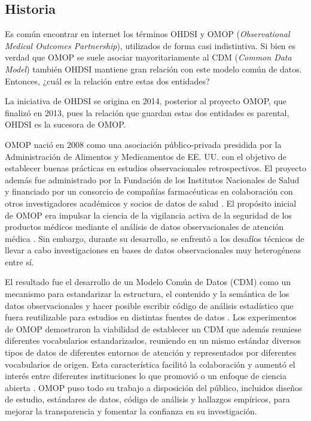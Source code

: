 \subsection{Historia}

Es común encontrar en internet los términos OHDSI y OMOP (\textit{Observational Medical Outcomes Partnership}), utilizados de forma casi indistintiva. Si bien es verdad que OMOP se suele asociar mayoritariamente al CDM (\textit{Common Data Model}) también OHDSI mantiene gran relación con este modelo común de datos. Entonces, ¿cuál es la relación entre estas dos entidades? 

La iniciativa de OHDSI se origina en 2014, posterior al proyecto OMOP, que finalizó en 2013, pues la relación que guardan estas dos entidades es parental, OHDSI es la sucesora de OMOP.

OMOP nació en 2008 como una asociación público-privada presidida por la Administración de Alimentos y Medicamentos de EE. UU. con el objetivo de establecer buenas prácticas en estudios observacionales retrospectivos. El proyecto además fue administrado por la Fundación de los Institutos Nacionales de Salud y financiado por un consorcio de compañías farmacéuticas en colaboración con otros investigadores académicos y socios de datos de salud \cite{stang2010advancing}. El propósito inicial de OMOP era impulsar la ciencia de la vigilancia activa de la seguridad de los productos médicos mediante el análisis de datos observacionales de atención médica \cite{stang2010advancing}. Sin embargo, durante su desarrollo, se enfrentó a los desafíos técnicos de llevar a cabo investigaciones en bases de datos observacionales muy heterogéneas entre sí.

El resultado fue el desarrollo de un Modelo Común de Datos (CDM) como un mecanismo para estandarizar la estructura, el contenido y la semántica de los datos observacionales y hacer posible escribir código de análisis estadístico que fuera reutilizable para estudios en distintas fuentes de datos \cite{overhage2012validation}. Los experimentos de OMOP demostraron la viabilidad de establecer un CDM que además reuniese diferentes vocabularios estandarizados, reuniendo en un mismo estándar diversos tipos de datos de diferentes entornos de atención y representados por diferentes vocabularios de origen. Esta característica facilitó la colaboración y aumentó el interés entre diferentes instituciones lo que promovió o un enfoque de ciencia abierta \cite{OHDSIbook}. OMOP puso todo su trabajo a disposición del público, incluidos diseños de estudio, estándares de datos, código de análisis y hallazgos empíricos, para mejorar la transparencia y fomentar la confianza en su investigación. 

